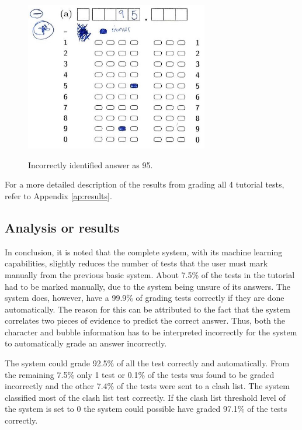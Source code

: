 \begin{figure}
  \centering
  \includegraphics[width=8cm]{wrongResult}\\
  \caption{Incorrectly identified answer as 95.}
  \label{fig:wrongAns}
\end{figure}

For a more detailed description of the results from grading all 4 tutorial tests, refer to Appendix \ref{ap:results}.

\subsection{Analysis or results}

In conclusion, it is noted that the complete system, with its machine learning capabilities, slightly reduces the number of tests that the user must mark manually from the previous basic system. About 7.5\% of the tests in the tutorial had to be marked manually, due to the system being unsure of its answers. The system does, however, have a 99.9\% of grading tests correctly if they are done automatically. The reason for this can be attributed to the fact that the system correlates two pieces of evidence to predict the correct answer. Thus, both the character and bubble information has to be interpreted incorrectly for the system to automatically grade an answer incorrectly. 

The system could grade 92.5\% of all the test correctly and automatically. From the remaining 7.5\% only 1 test or 0.1\% of the tests was found to be graded incorrectly and the other 7.4\% of the tests were sent to a clash list. The system classified most of the clash list test correctly. If the clash list threshold level of the system is set to 0 the system could possible have graded 97.1\% of the tests correctly.

